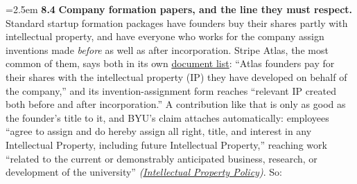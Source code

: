 \documentclass[11pt]{article}
\newcommand{\clause}[1]{%
  \par\addvspace{5pt plus 1pt}%
  \noindent\hangindent=2.5em\hangafter=1
  {\color{byunavy}\bfseries #1}\hspace{0.7em}\ignorespaces}
\newcommand{\policyref}[1]{{\small\itshape(#1)}}
\begin{document}
\clause{8.4} \textbf{Company formation papers, and the line they must
respect.} Standard startup formation packages have founders buy their shares
partly with intellectual property, and have everyone who works for
the company assign inventions made \emph{before} as well as after
incorporation. Stripe Atlas, the most common of them, says both in its own
\href{https://docs.stripe.com/atlas/incorporation-documents}{document list}:
``Atlas founders pay for their shares with the intellectual property (IP)
they have developed on behalf of the company,'' and its invention-assignment
form reaches ``relevant IP created both before and after incorporation.'' A
contribution like that is only as good as the founder's title to it, and BYU's claim attaches automatically: employees ``agree to assign and
do hereby assign all right, title, and interest in any Intellectual Property,
including future Intellectual Property,'' reaching work ``related to the
current or demonstrably anticipated business, research, or development of the
university''
\policyref{\href{https://policy.byu.edu/view/intellectual-property-policy}{Intellectual
Property Policy}}. So:
\end{document}
